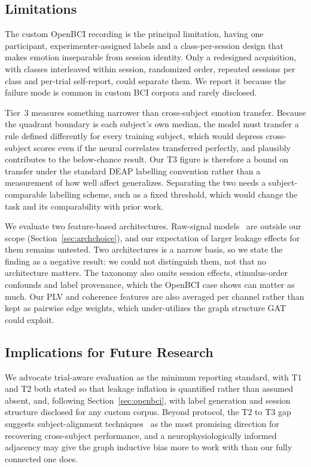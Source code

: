 \documentclass[conference,a4paper]{IEEEtran}
\begin{document}
\subsection{Limitations}
\label{sec:limits}

The custom OpenBCI recording is the principal limitation, having one participant, experimenter-assigned labels and a class-per-session design that makes emotion inseparable from session identity. Only a redesigned acquisition, with classes interleaved within session, randomized order, repeated sessions per class and per-trial self-report, could separate them. We report it because the failure mode is common in custom BCI corpora and rarely disclosed.

Tier~3 measures something narrower than cross-subject emotion transfer. Because the quadrant boundary is each subject's own median, the model must transfer a rule defined differently for every training subject, which would depress cross-subject scores even if the neural correlates transferred perfectly, and plausibly contributes to the below-chance result. Our T3 figure is therefore a bound on transfer under the standard DEAP labelling convention rather than a measurement of how well affect generalizes. Separating the two needs a subject-comparable labelling scheme, such as a fixed threshold, which would change the task and its comparability with prior work.

We evaluate two feature-based architectures. Raw-signal models~\cite{lawhern2018, song2023} are outside our scope (Section~\ref{sec:archchoice}), and our expectation of larger leakage effects for them remains untested. Two architectures is a narrow basis, so we state the finding as a negative result: we could not distinguish them, not that no architecture matters. The taxonomy also omits session effects, stimulus-order confounds and label provenance, which the OpenBCI case shows can matter as much. Our PLV and coherence features are also averaged per channel rather than kept as pairwise edge weights, which under-utilizes the graph structure GAT could exploit.

\subsection{Implications for Future Research}

We advocate trial-aware evaluation as the minimum reporting standard, with T1 and T2 both stated so that leakage inflation is quantified rather than assumed absent, and, following Section~\ref{sec:openbci}, with label generation and session structure disclosed for any custom corpus. Beyond protocol, the T2 to T3 gap suggests subject-alignment techniques~\cite{lotte2018, ning2021} as the most promising direction for recovering cross-subject performance, and a neurophysiologically informed adjacency may give the graph inductive bias more to work with than our fully connected one does.
\end{document}
